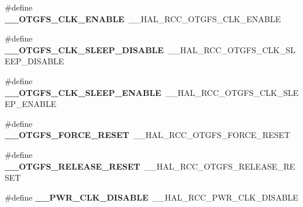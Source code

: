\begin{DoxyCompactItemize}
\item 
\#define {\bfseries \+\_\+\+\_\+\+O\+T\+G\+F\+S\+\_\+\+C\+L\+K\+\_\+\+E\+N\+A\+B\+LE}~\+\_\+\+\_\+\+H\+A\+L\+\_\+\+R\+C\+C\+\_\+\+O\+T\+G\+F\+S\+\_\+\+C\+L\+K\+\_\+\+E\+N\+A\+B\+LE\hypertarget{group___h_a_l___r_c_c___aliased_ga3703949f8a2d819cb3097098883a5922}{}\label{group___h_a_l___r_c_c___aliased_ga3703949f8a2d819cb3097098883a5922}

\item 
\#define {\bfseries \+\_\+\+\_\+\+O\+T\+G\+F\+S\+\_\+\+C\+L\+K\+\_\+\+S\+L\+E\+E\+P\+\_\+\+D\+I\+S\+A\+B\+LE}~\+\_\+\+\_\+\+H\+A\+L\+\_\+\+R\+C\+C\+\_\+\+O\+T\+G\+F\+S\+\_\+\+C\+L\+K\+\_\+\+S\+L\+E\+E\+P\+\_\+\+D\+I\+S\+A\+B\+LE\hypertarget{group___h_a_l___r_c_c___aliased_ga8a660adfdaf43449bcaa7febee65c64b}{}\label{group___h_a_l___r_c_c___aliased_ga8a660adfdaf43449bcaa7febee65c64b}

\item 
\#define {\bfseries \+\_\+\+\_\+\+O\+T\+G\+F\+S\+\_\+\+C\+L\+K\+\_\+\+S\+L\+E\+E\+P\+\_\+\+E\+N\+A\+B\+LE}~\+\_\+\+\_\+\+H\+A\+L\+\_\+\+R\+C\+C\+\_\+\+O\+T\+G\+F\+S\+\_\+\+C\+L\+K\+\_\+\+S\+L\+E\+E\+P\+\_\+\+E\+N\+A\+B\+LE\hypertarget{group___h_a_l___r_c_c___aliased_ga8f38b03c4194f0f482144aadcb00ab8f}{}\label{group___h_a_l___r_c_c___aliased_ga8f38b03c4194f0f482144aadcb00ab8f}

\item 
\#define {\bfseries \+\_\+\+\_\+\+O\+T\+G\+F\+S\+\_\+\+F\+O\+R\+C\+E\+\_\+\+R\+E\+S\+ET}~\+\_\+\+\_\+\+H\+A\+L\+\_\+\+R\+C\+C\+\_\+\+O\+T\+G\+F\+S\+\_\+\+F\+O\+R\+C\+E\+\_\+\+R\+E\+S\+ET\hypertarget{group___h_a_l___r_c_c___aliased_ga594ca5912c4170fab0422fb9063e3ced}{}\label{group___h_a_l___r_c_c___aliased_ga594ca5912c4170fab0422fb9063e3ced}

\item 
\#define {\bfseries \+\_\+\+\_\+\+O\+T\+G\+F\+S\+\_\+\+R\+E\+L\+E\+A\+S\+E\+\_\+\+R\+E\+S\+ET}~\+\_\+\+\_\+\+H\+A\+L\+\_\+\+R\+C\+C\+\_\+\+O\+T\+G\+F\+S\+\_\+\+R\+E\+L\+E\+A\+S\+E\+\_\+\+R\+E\+S\+ET\hypertarget{group___h_a_l___r_c_c___aliased_gafe14baff640d24ba82665e9b513beb8f}{}\label{group___h_a_l___r_c_c___aliased_gafe14baff640d24ba82665e9b513beb8f}

\item 
\#define {\bfseries \+\_\+\+\_\+\+P\+W\+R\+\_\+\+C\+L\+K\+\_\+\+D\+I\+S\+A\+B\+LE}~\+\_\+\+\_\+\+H\+A\+L\+\_\+\+R\+C\+C\+\_\+\+P\+W\+R\+\_\+\+C\+L\+K\+\_\+\+D\+I\+S\+A\+B\+LE\hypertarget{group___h_a_l___r_c_c___aliased_ga618cc267c53fbccdcfeea3d953346693}{}\label{group___h_a_l___r_c_c___aliased_ga618cc267c53fbccdcfeea3d953346693}


\end{DoxyCompactItemize}
